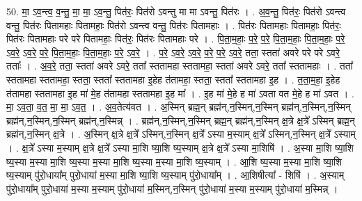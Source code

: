 \documentclass[17pt]{extarticle}
\begin{document}
50. मा॒ ऽव॒न्त्व॒ व॒न्तु॒ मा॒ मा॒ ऽव॒न्तु॒ पित॑रः॒ पित॑रो ऽवन्तु मा मा ऽवन्तु॒ पित॑रः । . अ॒व॒न्तु॒ पित॑रः॒ पित॑रो ऽवन्त्व वन्तु॒ पित॑रः पितामहाः पितामहाः॒ पित॑रो ऽवन्त्व वन्तु॒ पित॑रः पितामहाः । . पित॑रः पितामहाः पितामहाः॒ पित॑रः॒ पित॑रः पितामहाः परे परे पितामहाः॒ पित॑रः॒ पित॑रः पितामहाः परे । . पि॒ता॒म॒हाः॒ प॒रे॒ प॒रे॒ पि॒ता॒म॒हाः॒ पि॒ता॒म॒हाः॒ प॒रे॒ ऽव॒रे॒ ऽव॒रे॒ प॒रे॒ पि॒ता॒म॒हाः॒ पि॒ता॒म॒हाः॒ प॒रे॒ ऽव॒रे॒ । . प॒रे॒ ऽव॒रे॒ ऽव॒रे॒ प॒रे॒ प॒रे॒ ऽव॒रे॒ तता॒ स्तता॑ अवरे परे परे ऽवरे॒ तताः᳚ । . अ॒व॒रे॒ तता॒ स्तता॑ अवरे ऽवरे॒ तता᳚ स्ततामहा स्ततामहा॒ स्तता॑ अवरे ऽवरे॒ तता᳚ स्ततामहाः । . तता᳚ स्ततामहा स्ततामहा॒ स्तता॒ स्तता᳚ स्ततामहा इ॒हेह त॑तामहा॒ स्तता॒ स्तता᳚ स्ततामहा इ॒ह । . त॒ता॒म॒हा॒ इ॒हेह त॑तामहा स्ततामहा इ॒ह मा॑ मे॒ह त॑तामहा स्ततामहा इ॒ह मा᳚ । . इ॒ह मा॑ मे॒हे ह मा॑ ऽवता वत मे॒हे ह मा॑ ऽवत । . मा॒ ऽव॒ता॒ व॒त॒ मा॒ मा॒ ऽव॒त॒ । . अ॒व॒तेत्य॑वत । . अ॒स्मिन् ब्रह्म॒न् ब्रह्म॑न्,न॒स्मिन्,न॒स्मिन् ब्रह्म॑न्,न॒स्मिन्,न॒स्मिन् ब्रह्म॑न्,न॒स्मिन्,न॒स्मिन् ब्रह्म॑न्,न॒स्मिन्न् । . ब्रह्म॑न्,न॒स्मिन्,न॒स्मिन् ब्रह्म॒न् ब्रह्म॑न्,न॒स्मिन् क्ष॒त्रे क्ष॒त्रे᳚ ऽस्मिन् ब्रह्म॒न् ब्रह्म॑न्,न॒स्मिन् क्ष॒त्रे । . अ॒स्मिन् क्ष॒त्रे क्ष॒त्रे᳚ ऽस्मिन्,न॒स्मिन् क्ष॒त्रे᳚ ऽस्या म॒स्याम् क्ष॒त्रे᳚ ऽस्मिन्,न॒स्मिन् क्ष॒त्रे᳚ ऽस्याम् । . क्ष॒त्रे᳚ ऽस्या म॒स्याम् क्ष॒त्रे क्ष॒त्रे᳚ ऽस्या मा॒शि ष्या॒शि ष्य॒स्याम् क्ष॒त्रे क्ष॒त्रे᳚ ऽस्या मा॒शिषि॑ । . अ॒स्या मा॒शि ष्या॒शि ष्य॒स्या म॒स्या मा॒शि ष्य॒स्या म॒स्या मा॒शि ष्य॒स्या म॒स्या मा॒शि ष्य॒स्याम् । . आ॒शि ष्य॒स्या म॒स्या मा॒शि ष्या॒शि ष्य॒स्याम् पु॑रो॒धाया᳚म् पुरो॒धाया॑ म॒स्या मा॒शि ष्या॒शि ष्य॒स्याम् पु॑रो॒धाया᳚म् । . आ॒शिषीत्या᳚ - शिषि॑ । . अ॒स्याम् पु॑रो॒धाया᳚म् पुरो॒धाया॑ म॒स्या म॒स्याम् पु॑रो॒धाया॑ म॒स्मिन्,न॒स्मिन् पु॑रो॒धाया॑ म॒स्या म॒स्याम् पु॑रो॒धाया॑ म॒स्मिन्न् । \newline
\end{document}
